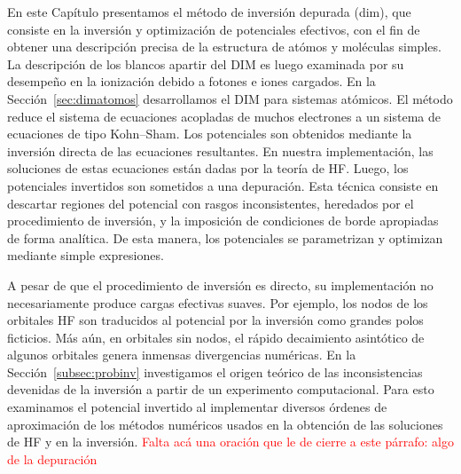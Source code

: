 En este Capítulo presentamos el método de inversión depurada (\acs{dim}),
que consiste en la inversión y optimización de potenciales efectivos, 
con el fin de obtener una descripción precisa de la estructura de atómos 
y moléculas simples. La descripción de los blancos apartir del DIM es 
luego examinada por su desempeño en la ionización debido a fotones e 
iones cargados. En la Sección~\ref{sec:dimatomos} desarrollamos el DIM 
para sistemas atómicos. El método reduce el sistema de ecuaciones 
acopladas de muchos electrones a un sistema de ecuaciones de tipo 
Kohn--Sham. Los potenciales son obtenidos mediante la inversión directa 
de las ecuaciones resultantes. En nuestra implementación, las soluciones 
de estas ecuaciones están dadas por la teoría de HF. Luego, los 
potenciales invertidos son sometidos a una depuración. Esta técnica 
consiste en descartar regiones del potencial con rasgos inconsistentes, 
heredados por el procedimiento de inversión, y la imposición de 
condiciones de borde apropiadas de forma analítica. De esta manera, los 
potenciales se parametrizan y optimizan mediante simple expresiones. 

A pesar de que el procedimiento de inversión es directo, su 
implementación no necesariamente produce cargas efectivas suaves. Por 
ejemplo, los nodos de los orbitales HF son traducidos al potencial por 
la inversión como grandes polos ficticios. Más aún, en orbitales sin 
nodos, el rápido decaimiento asintótico de algunos orbitales genera 
inmensas divergencias numéricas. En la Sección~\ref{subsec:probinv} 
investigamos el origen teórico de las inconsistencias devenidas de la 
inversión a partir de un experimento computacional. Para esto examinamos 
el potencial invertido al implementar diversos órdenes de aproximación 
de los métodos numéricos usados en la obtención de las soluciones de HF 
y en la inversión. 
\textcolor{red}{Falta acá una oración que le de cierre a este párrafo: algo de la depuración}

